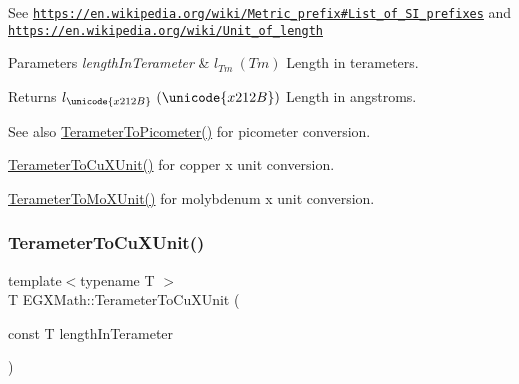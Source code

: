 See \href{https://en.wikipedia.org/wiki/Metric_prefix#List_of_SI_prefixes}{\tt https\+://en.\+wikipedia.\+org/wiki/\+Metric\+\_\+prefix\#\+List\+\_\+of\+\_\+\+S\+I\+\_\+prefixes} and \href{https://en.wikipedia.org/wiki/Unit_of_length}{\tt https\+://en.\+wikipedia.\+org/wiki/\+Unit\+\_\+of\+\_\+length} 
\begin{DoxyParams}{Parameters}
{\em length\+In\+Terameter} & $ l_{Tm}\ (Tm)$ Length in terameters. \\
\hline
\end{DoxyParams}
\begin{DoxyReturn}{Returns}
$ l_{\unicode{x212B}}\ (\unicode{x212B})$ Length in angstroms. 
\end{DoxyReturn}
\begin{DoxySeeAlso}{See also}
\mbox{\hyperlink{group___e_g_x_math-_conversions-_length_conversions-_terameter-_s_i_ga131f3ccf4db05a31f5bd5c9487da9a4e}{Terameter\+To\+Picometer()}} for picometer conversion. 

\mbox{\hyperlink{group___e_g_x_math-_conversions-_length_conversions-_terameter-_non-_s_i_ga5eab9d29867c570350691cca342c9472}{Terameter\+To\+Cu\+X\+Unit()}} for copper x unit conversion. 

\mbox{\hyperlink{group___e_g_x_math-_conversions-_length_conversions-_terameter-_non-_s_i_ga391bcf9b529c2e20f2773c699bb0197a}{Terameter\+To\+Mo\+X\+Unit()}} for molybdenum x unit conversion. 
\end{DoxySeeAlso}
\mbox{\label{group___e_g_x_math-_conversions-_length_conversions-_terameter-_non-_s_i_ga5eab9d29867c570350691cca342c9472}} 
\subsubsection{\texorpdfstring{Terameter\+To\+Cu\+X\+Unit()}{TerameterToCuXUnit()}}
{\footnotesize\ttfamily template$<$typename T $>$ \\
T E\+G\+X\+Math\+::\+Terameter\+To\+Cu\+X\+Unit (\begin{DoxyParamCaption}\item[{const T}]{length\+In\+Terameter }\end{DoxyParamCaption})}




